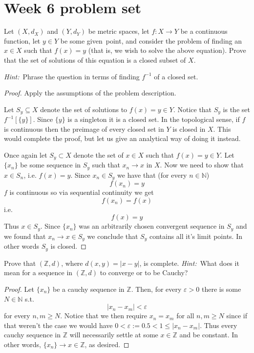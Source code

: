 \newpage 
\section{Week 6 problem set}
\begin{prob}
    Let $(X,d_X)$ and $(Y,d_Y)$ be metric spaces, let $f:X\to Y$ be a continuous function, let $y\in Y$ be some given point, and consider the problem of finding an $x\in X$ such that $f(x)=y$ (that is, we wish to solve the above equation). Prove that the set of solutions of this equation is a closed subset of $X$.  

    \emph{Hint:} Phrase the question in terms of finding $f^{-1}$ of a closed set.
\end{prob}
\begin{proof}
    Apply the assumptions of the problem description.

    Let $S_y \subseteq X$ denote the set of solutions to 
    $f(x) = y \in Y$.
    Notice that $S_y$ is the set $f^{-1}[\{y\}]$. Since $\{y\}$ is 
    a singleton it is a closed set. 
    In the topological sense, if $f$ is continuous then the preimage 
    of every closed set in $Y$ is closed in $X$. 
    This would complete the proof, but let us give an analytical 
    way of doing it instead. 

    Once again let $S_y \subset X$ denote the set of $x \in X$ such 
    that $f(x) = y \in Y$. Let $\{x_n\}$ be some sequence in 
    $S_y$ such that $x_n \to x$ in $X$. Now we need to show 
    that $x \in S_n$, i.e. $f(x) = y$. Since $x_n \in S_y$ 
    we have that (for every $n \in \mathbb N$) 
    \[
        f(x_n) = y
    \]
    $f$ is continuous so via sequential continuity we get 
    \[
        f(x_n) = f(x)
    \]
    i.e. 
    \[
        f(x) = y
    \]
    Thus $x \in S_y$. 
    Since $\{x_n\}$ was an arbitrarily chosen convergent sequence 
    in $S_y$ and we found that $x_n \to x \in S_y$ we conclude 
    that $S_y$ contains all it's limit points. In other 
    words $S_y$ is closed. 
\end{proof}
\begin{prob}
    Prove that $(\mathbb{Z},d)$, where $d(x,y)=|x-y|$, is complete.  
    \emph{Hint:} What does it mean for a sequence in $(\mathbb{Z},d)$ to converge or to be Cauchy?
\end{prob}
\begin{proof}
    Let $\{x_n\}$ be a cauchy sequence in $\mathbb Z$. 
    Then, for every $\varepsilon > 0$ there is some $N \in \mathbb N$
    s.t. 
    \[
        |x_n - x_m| < \varepsilon
    \] 
    for every $n,m \geq N$. 
    Notice that we then require $x_n = x_m$ for all $n,m \geq N$ 
    since if that weren't the case we would have 
    $0 < \varepsilon := 0.5 < 1 \leq |x_n - x_m|$. Thus 
    every cauchy sequence in $\mathbb Z$ will necessarily settle 
    at some $x \in \mathbb Z$ and be constant. In other words, 
    $\{x_n\} \to x \in \mathbb Z$, as desired.  
\end{proof}

